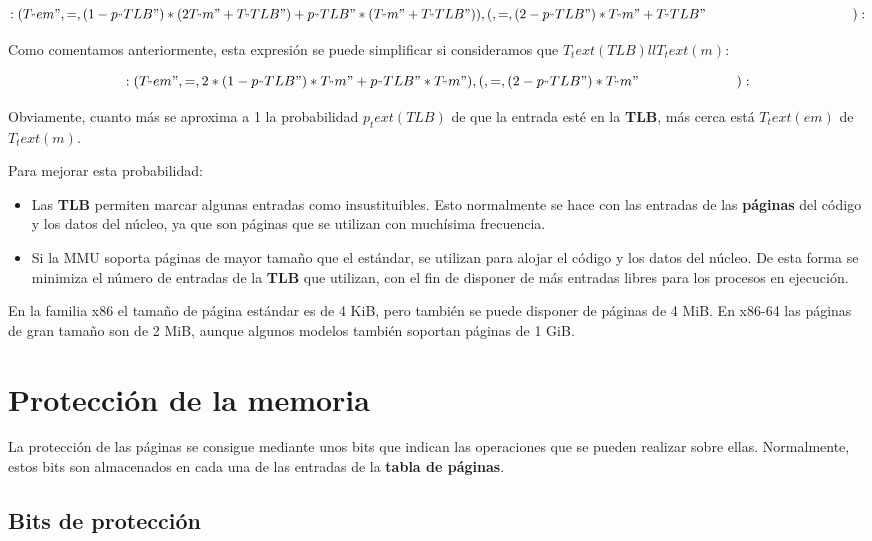 \[{:(T_"em", =, (1-p_"TLB")*(2T_"m" + T_"TLB") + p_"TLB"*(T_"m" + T_"TLB")),
    (    , =, (2-p_"TLB")*T_"m" + T_"TLB"\qquad\qquad\qquad\qquad\qquad\ \ \ ):}\]

Como comentamos anteriormente, esta expresión se puede simplificar si
consideramos que \(T_text(TLB) ll T_text(m)\):

\[{:(T_"em", =, 2*(1-p_"TLB")*T_"m" + p_"TLB"*T_"m"),
    (    , =, (2-p_"TLB")*T_"m"\qquad\qquad\qquad\ \ \ ):}\]

Obviamente, cuanto más se aproxima a 1 la probabilidad \(p_text(TLB)\)
de que la entrada esté en la \textbf{TLB}, más cerca está \(T_text(em)\)
de \(T_text(m)\).

Para mejorar esta probabilidad:

\begin{itemize}
\item
  Las \textbf{TLB} permiten marcar algunas entradas como insustituibles.
  Esto normalmente se hace con las entradas de las \textbf{páginas} del
  código y los datos del núcleo, ya que son páginas que se utilizan con
  muchísima frecuencia.
\item
  Si la MMU soporta páginas de mayor tamaño que el estándar, se utilizan
  para alojar el código y los datos del núcleo. De esta forma se
  minimiza el número de entradas de la \textbf{TLB} que utilizan, con el
  fin de disponer de más entradas libres para los procesos en ejecución.
\end{itemize}

En la familia x86 el tamaño de página estándar es de 4 KiB, pero también
se puede disponer de páginas de 4 MiB. En x86-64 las páginas de gran
tamaño son de 2 MiB, aunque algunos modelos también soportan páginas de
1 GiB.

\section{Protección de la memoria}\label{_protecciuxf3n_de_la_memoria}

La protección de las páginas se consigue mediante unos bits que indican
las operaciones que se pueden realizar sobre ellas. Normalmente, estos
bits son almacenados en cada una de las entradas de la \textbf{tabla de
páginas}.

\subsection{Bits de protección}\label{_bits_de_protecciuxf3n}


